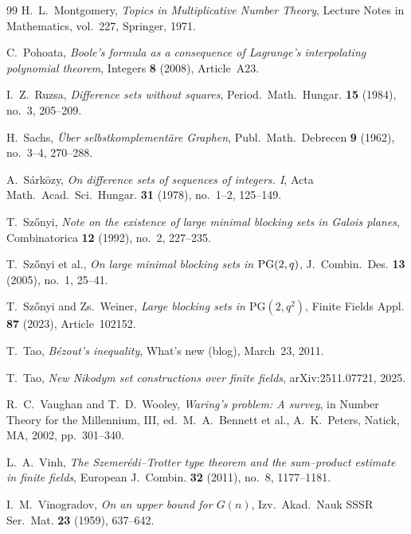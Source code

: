 \documentclass[12pt,reqno]{amsart}
\theoremstyle{plain}
\theoremstyle{definition}
\newcommand{\1}{\mathbf{1}}
\begin{document}
\begin{thebibliography}{99}
H.~L.~Montgomery,
\newblock \emph{Topics in Multiplicative Number Theory},
\newblock Lecture Notes in Mathematics, vol.~227, Springer, 1971.

C.~Pohoata,
\newblock \emph{Boole's formula as a consequence of Lagrange's interpolating polynomial theorem},
\newblock Integers \textbf{8} (2008), Article~A23.

I.~Z.~Ruzsa,
\newblock \emph{Difference sets without squares},
\newblock Period.\ Math.\ Hungar. \textbf{15} (1984), no.~3, 205--209.

H.~Sachs,
\newblock \emph{\"Uber selbstkomplement\"are Graphen},
\newblock Publ.\ Math.\ Debrecen \textbf{9} (1962), no.~3--4, 270--288.

A.~S\'ark\"ozy,
\newblock \emph{On difference sets of sequences of integers. I},
\newblock Acta Math.\ Acad.\ Sci.\ Hungar. \textbf{31} (1978), no.~1--2, 125--149.

T.~Sz\H{o}nyi,
\newblock \emph{Note on the existence of large minimal blocking sets in Galois planes},
\newblock Combinatorica \textbf{12} (1992), no.~2, 227--235.

T.~Sz\H{o}nyi et al.,
\newblock \emph{On large minimal blocking sets in ${\rm PG}(2,q)$},
\newblock J.\ Combin.\ Des. \textbf{13} (2005), no.~1, 25--41.

T.~Sz\H{o}nyi and Zs.~Weiner,
\newblock \emph{Large blocking sets in $\mathrm{PG}(2,q^{2})$},
\newblock Finite Fields Appl. \textbf{87} (2023), Article~102152.

T.~Tao,
\newblock \emph{B{\'e}zout’s inequality},
\newblock What’s new (blog), March~23, 2011.

T.~Tao,
\newblock \emph{New Nikodym set constructions over finite fields},
\newblock arXiv:2511.07721, 2025.

R.~C.~Vaughan and T.~D.~Wooley,
\newblock \emph{Waring's problem: A survey},
\newblock in Number Theory for the Millennium, III,
ed.\ M.~A.~Bennett et al., A.~K.~Peters, Natick, MA, 2002, pp.~301--340.

L.~A.~Vinh,
\newblock \emph{The Szemer\'edi--Trotter type theorem and the sum--product estimate in finite fields},
\newblock European J.\ Combin. \textbf{32} (2011), no.~8, 1177--1181.

I.~M.~Vinogradov,
\newblock \emph{On an upper bound for $G(n)$},
\newblock Izv.\ Akad.\ Nauk SSSR Ser.\ Mat. \textbf{23} (1959), 637--642.


\end{thebibliography}
\end{document}
